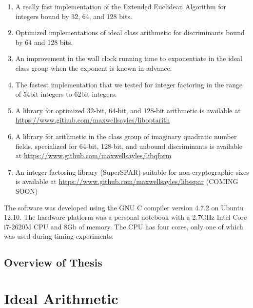 \documentclass{ucalgthes1}
\theoremstyle{definition}
\begin{document}
\begin{enumerate}
\item A really fast implementation of the Extended Euclidean Algorithm for integers bound by 32, 64, and 128 bits.

\item Optimized implementations of ideal class arithmetic for discriminants bound by 64 and 128 bits.

\item An improvement in the wall clock running time to exponentiate in the ideal class group when the exponent is known in advance.

\item The fastest implementation that we tested for integer factoring in the range of 54bit integers to 62bit integers.

\item A library for optimized 32-bit, 64-bit, and 128-bit arithmetic is available at \url{https://www.github.com/maxwellsayles/liboptarith}

\item A library for arithmetic in the class group of imaginary quadratic number fields, specialized for 64-bit, 128-bit, and unbound discriminants is available at \url{https://www.github.com/maxwellsayles/libqform}

\item An integer factoring library (SuperSPAR) suitable for non-cryptographic sizes is available at \url{https://www.github.com/maxwellsayles/libsspar}  (COMING SOON)

\end{enumerate}

The software was developed using the GNU C compiler version 4.7.2 on Ubuntu 12.10. The hardware platform was a personal notebook with a 2.7GHz Intel Core i7-2620M CPU and 8Gb of memory.  The CPU has four cores, only one of which was used during timing experiments.

\section{Overview of Thesis}



\chapter{Ideal Arithmetic}
\label{chap:idealArithmetic}
\end{document}

